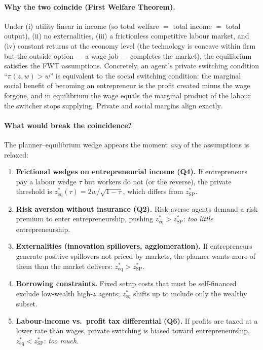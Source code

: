 \documentclass[11pt,a4paper]{article}
\begin{document}
\paragraph{Why the two coincide (First Welfare Theorem).}
Under (i) utility linear in income (so total welfare $=$ total income $=$ total output), (ii) no externalities, (iii) a frictionless competitive labour market, and (iv) constant returns at the economy level (the technology is concave within firm but the outside option --- a wage job --- completes the market), the equilibrium satisfies the FWT assumptions. Concretely, an agent's private switching condition ``$\pi(z,w)>w$'' is equivalent to the social switching condition: the marginal social benefit of becoming an entrepreneur is the profit created minus the wage forgone, and in equilibrium the wage equals the marginal product of the labour the switcher stops supplying. Private and social margins align exactly.

\paragraph{What would break the coincidence?}
The planner--equilibrium wedge appears the moment \emph{any} of the assumptions is relaxed:
\begin{enumerate}[leftmargin=*,itemsep=1pt]
    \item \textbf{Frictional wedges on entrepreneurial income (Q4).} If entrepreneurs pay a labour wedge $\tau$ but workers do not (or the reverse), the private threshold is $z^{*}_{\text{eq}}(\tau)=2w/\sqrt{1-\tau}$, which differs from $z^{*}_{\text{SP}}$.
    \item \textbf{Risk aversion without insurance (Q2).} Risk-averse agents demand a risk premium to enter entrepreneurship, pushing $z^{*}_{\text{eq}}>z^{*}_{\text{SP}}$: \emph{too little} entrepreneurship.
    \item \textbf{Externalities (innovation spillovers, agglomeration).} If entrepreneurs generate positive spillovers not priced by markets, the planner wants more of them than the market delivers: $z^{*}_{\text{eq}}>z^{*}_{\text{SP}}$.
    \item \textbf{Borrowing constraints.} Fixed setup costs that must be self-financed exclude low-wealth high-$z$ agents; $z^{*}_{\text{eq}}$ shifts up to include only the wealthy subset.
    \item \textbf{Labour-income vs.\ profit tax differential (Q6).} If profits are taxed at a lower rate than wages, private switching is biased toward entrepreneurship, $z^{*}_{\text{eq}}<z^{*}_{\text{SP}}$: \emph{too much}.
\end{enumerate}
\end{document}
